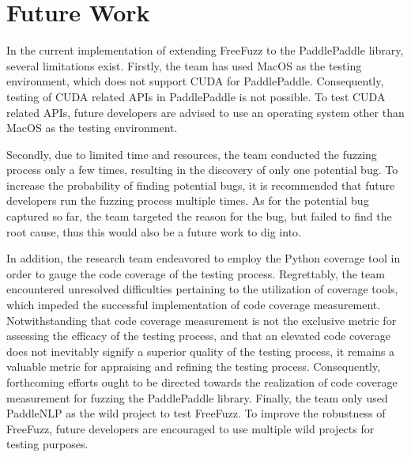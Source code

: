 \documentclass[sigconf]{acmart}
\begin{document}
\section{Future Work}
In the current implementation of extending FreeFuzz to the PaddlePaddle library, several limitations exist. 
Firstly, the team has used MacOS as the testing environment, which does not support CUDA for PaddlePaddle\cite{c1}. 
Consequently, testing of CUDA related APIs in PaddlePaddle is not possible. 
To test CUDA related APIs, future developers are advised to use an operating system other than MacOS as the testing environment.

Secondly, due to limited time and resources, the team conducted the fuzzing process only a few times, 
resulting in the discovery of only one potential bug. 
To increase the probability of finding potential bugs, it is recommended that future developers run the fuzzing process multiple times.
As for the potential bug captured so far, the team targeted the reason for the bug, but failed to find the root cause, 
thus this would also be a future work to dig into.

In addition, the research team endeavored to employ the Python coverage tool in order to gauge the code coverage of the testing process. Regrettably, the team encountered unresolved difficulties pertaining to the utilization of coverage tools, which impeded the successful implementation of code coverage measurement. Notwithstanding that code coverage measurement is not the exclusive metric for assessing the efficacy of the testing process, and that an elevated code coverage does not inevitably signify a superior quality of the testing process, it remains a valuable metric for appraising and refining the testing process. Consequently, forthcoming efforts ought to be directed towards the realization of code coverage measurement for fuzzing the PaddlePaddle library.
Finally, the team only used PaddleNLP as the wild project to test FreeFuzz. 
To improve the robustness of FreeFuzz, future developers are encouraged to use multiple wild projects for testing purposes.
\end{document}
